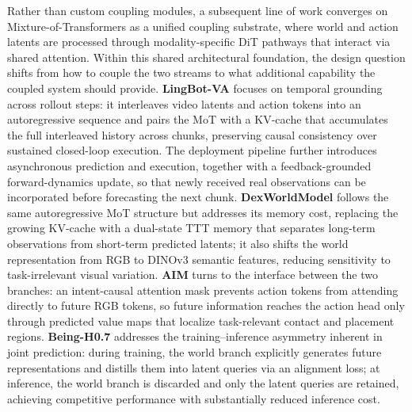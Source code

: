 Rather than custom coupling modules, a subsequent line of work converges on Mixture-of-Transformers as a unified coupling substrate, where world and action latents are processed through modality-specific DiT pathways that interact via shared attention. Within this shared architectural foundation, the design question shifts from how to couple the two streams to what additional capability the coupled system should provide.
\textbf{LingBot-VA} \cite{LingBotVA} focuses on temporal grounding across rollout steps: it interleaves video latents and action tokens into an autoregressive sequence and pairs the MoT with a KV-cache that accumulates the full interleaved history across chunks, preserving causal consistency over sustained closed-loop execution. The deployment pipeline further introduces asynchronous prediction and execution, together with a feedback-grounded forward-dynamics update, so that newly received real observations can be incorporated before forecasting the next chunk. \textbf{DexWorldModel} \cite{DexWorldModel} follows the same autoregressive MoT structure but addresses its memory cost, replacing the growing KV-cache with a dual-state TTT memory that separates long-term observations from short-term predicted latents; it also shifts the world representation from RGB to DINOv3 semantic features, reducing sensitivity to task-irrelevant visual variation. \textbf{AIM} \cite{AIM} turns to the interface between the two branches: an intent-causal attention mask prevents action tokens from attending directly to future RGB tokens, so future information reaches the action head only through predicted value maps that localize task-relevant contact and placement regions. \textbf{Being-H0.7} \cite{Being-H0.7} addresses the training–inference asymmetry inherent in joint prediction: during training, the world branch explicitly generates future representations and distills them into latent queries via an alignment loss; at inference, the world branch is discarded and only the latent queries are retained, achieving competitive performance with substantially reduced inference cost.

